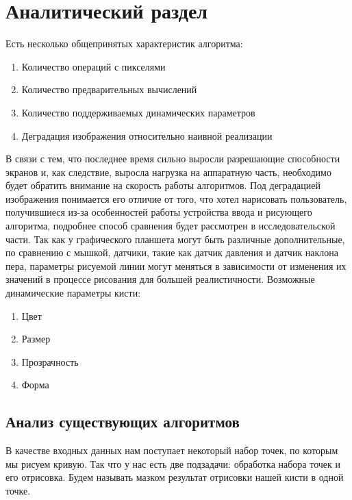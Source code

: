\chapter{Аналитический раздел}
\label{cha:analysis}
%
%
 Есть несколько общепринятых характеристик алгоритма:\cite{vc85}
\begin{enumerate}
	\item	Количество операций с пикселями
	\item	Количество предварительных вычислений
	\item	Количество поддерживаемых динамических параметров
	\item	Деградация изображения относительно наивной реализации
\end{enumerate}
В связи с тем, что последнее время сильно выросли разрешающие способности экранов и, как следствие, выросла нагрузка на аппаратную часть, необходимо будет обратить внимание на скорость работы алгоритмов.
Под деградацией изображения понимается его отличие от того, что хотел нарисовать пользователь, получившиеся из-за особенностей работы устройства ввода и рисующего алгоритма, подробнее способ сравнения будет рассмотрен в исследовательской части.
Так как у графического планшета могут быть различные дополнительные, по сравнению с мышкой, датчики, такие как датчик давления и датчик наклона пера, параметры рисуемой линии могут меняться в зависимости от изменения их значений в процессе рисования для большей реалистичности. Возможные динамические параметры кисти:
\begin{enumerate}
	\item	Цвет
	\item	Размер
	\item	Прозрачность
	\item	Форма
\end{enumerate}

\section{Анализ существующих алгоритмов}

В качестве входных данных нам поступает некоторый набор точек, по которым мы рисуем кривую. Так что у нас есть две подзадачи: обработка набора точек и его отрисовка. Будем называть мазком результат отрисовки нашей кисти в одной точке.

